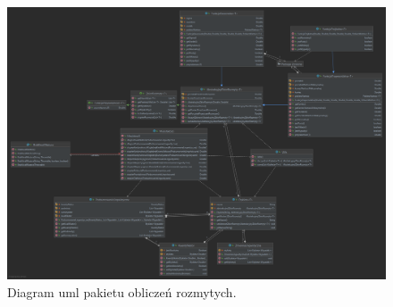 \documentclass{classrep}
\begin{document}
\begin{figure}[h!]
 \centering
 \includegraphics[width=14cm]{uml.png}
 \vspace{-0.3cm}
 \caption{Diagram uml pakietu obliczeń rozmytych. }
 \label{uml_obliczenia}
\end{figure}
\newpage
\end{document}
